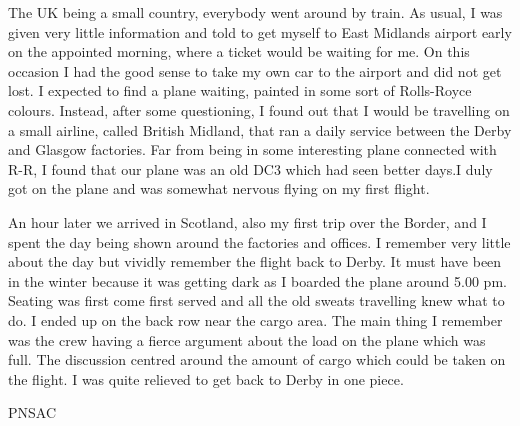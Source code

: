 The UK being a small country, everybody went around by train.  As
usual, I was given very little information and told to get myself to
East Midlands airport early on the appointed morning, where a ticket
would be waiting for me. On this occasion I had the good sense to take
my own car to the airport and did not get lost. I expected to find a
plane waiting, painted in some sort of Rolls-Royce colours. Instead,
after some questioning, I found out that I would be travelling on a
small airline, called British Midland, that ran a daily service
between the Derby and Glasgow factories. Far from being in some
interesting plane connected with R-R, I found that our plane was an
old DC3 which had seen better days.I duly got on the plane and was
somewhat nervous flying on my first flight.

An hour later we arrived in Scotland, also my first trip over the
Border, and I spent the day being shown around the factories and
offices.  I remember very little about the day but vividly remember
the flight back to Derby. It must have been in the winter because it
was getting dark as I boarded the plane around 5.00 pm. Seating was
first come first served and all the old sweats travelling knew what to
do. I ended up on the back row near the cargo area. The main thing I
remember was the crew having a fierce argument about the load on the
plane which was full. The discussion centred around the amount of
cargo which could be taken on the flight. I was quite relieved to get
back to Derby in one piece.



\begin{footnotesize}
    \raggedleft PNSAC\\
\end{footnotesize}



